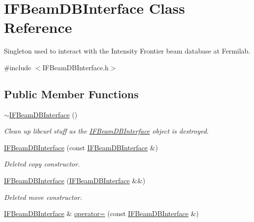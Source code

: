 \hypertarget{classIFBeamDBInterface}{
\section{IFBeamDBInterface Class Reference}
\label{classIFBeamDBInterface}
}


Singleton used to interact with the Intensity Frontier beam database at Fermilab.  


{\ttfamily \#include $<$IFBeamDBInterface.h$>$}\subsection*{Public Member Functions}
\begin{DoxyCompactItemize}
\item 
\hypertarget{classIFBeamDBInterface_ac6e95cfed4db9c455289234f26a2f1c1}{
\hyperlink{classIFBeamDBInterface_ac6e95cfed4db9c455289234f26a2f1c1}{$\sim$IFBeamDBInterface} ()}
\label{classIFBeamDBInterface_ac6e95cfed4db9c455289234f26a2f1c1}

\begin{DoxyCompactList}\small\item\em Clean up libcurl stuff as the \hyperlink{classIFBeamDBInterface}{IFBeamDBInterface} object is destroyed. \item\end{DoxyCompactList}\item 
\hypertarget{classIFBeamDBInterface_a5a3bc058c6b8ca2e3d13b85ca1f42e2d}{
\hyperlink{classIFBeamDBInterface_a5a3bc058c6b8ca2e3d13b85ca1f42e2d}{IFBeamDBInterface} (const \hyperlink{classIFBeamDBInterface}{IFBeamDBInterface} \&)}
\label{classIFBeamDBInterface_a5a3bc058c6b8ca2e3d13b85ca1f42e2d}

\begin{DoxyCompactList}\small\item\em Deleted copy constructor. \item\end{DoxyCompactList}\item 
\hypertarget{classIFBeamDBInterface_a25624ce40601f7ee32b039c34466d5cc}{
\hyperlink{classIFBeamDBInterface_a25624ce40601f7ee32b039c34466d5cc}{IFBeamDBInterface} (\hyperlink{classIFBeamDBInterface}{IFBeamDBInterface} \&\&)}
\label{classIFBeamDBInterface_a25624ce40601f7ee32b039c34466d5cc}

\begin{DoxyCompactList}\small\item\em Deleted move constructor. \item\end{DoxyCompactList}\item 
\hypertarget{classIFBeamDBInterface_a9550adf51f7c043e9ba628e920202ec2}{
\hyperlink{classIFBeamDBInterface}{IFBeamDBInterface} \& \hyperlink{classIFBeamDBInterface_a9550adf51f7c043e9ba628e920202ec2}{operator=} (const \hyperlink{classIFBeamDBInterface}{IFBeamDBInterface} \&)}
\label{classIFBeamDBInterface_a9550adf51f7c043e9ba628e920202ec2}


\end{DoxyCompactItemize}
